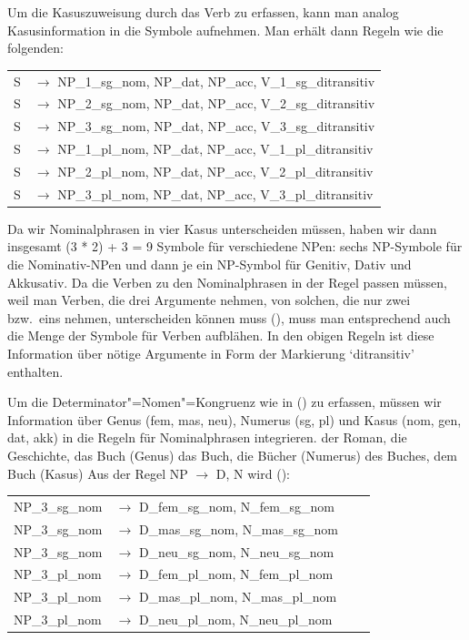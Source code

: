 Um die Kasuszuweisung durch das Verb zu erfassen, kann man analog Kasusinformation in die
Symbole aufnehmen. Man erhält dann Regeln wie die folgenden:
\ea
\label{ditrans-ps-regeln}
\begin{tabular}[t]{@{}l@{ }l}
S  & $\to$ NP\_1\_sg\_nom, NP\_dat, NP\_acc, V\_1\_sg\_ditransitiv\\
S  & $\to$ NP\_2\_sg\_nom, NP\_dat, NP\_acc, V\_2\_sg\_ditransitiv\\
S  & $\to$ NP\_3\_sg\_nom, NP\_dat, NP\_acc, V\_3\_sg\_ditransitiv\\
S  & $\to$ NP\_1\_pl\_nom, NP\_dat, NP\_acc, V\_1\_pl\_ditransitiv\\
S  & $\to$ NP\_2\_pl\_nom, NP\_dat, NP\_acc, V\_2\_pl\_ditransitiv\\
S  & $\to$ NP\_3\_pl\_nom, NP\_dat, NP\_acc, V\_3\_pl\_ditransitiv\\
\end{tabular}
\z
Da wir Nominalphrasen in vier Kasus unterscheiden müssen, haben wir dann
insgesamt (3 * 2) + 3 = 9 Symbole für verschiedene NPen: sechs NP-Symbole für die Nominativ-NPen und
dann je ein NP-Symbol für Genitiv, Dativ und Akkusativ. Da die Verben zu den Nominalphrasen
in der Regel passen müssen, weil man \zb Verben, die drei Argumente nehmen, von solchen,
die nur zwei bzw.\ eins nehmen, unterscheiden können muss (), muss man entsprechend auch
die Menge der Symbole für Verben aufblähen.
\eal
{}
\zl
In den obigen Regeln ist diese Information über nötige Argumente in Form der
Markierung `ditransitiv' enthalten.

Um die Determinator"=Nomen"=Kongruenz wie in () zu erfassen, müssen wir Information 
über Genus (fem, mas, neu), Numerus (sg, pl) und Kasus (nom, gen, dat, akk)
in die Regeln für Nominalphrasen integrieren.
\eal
\ex der Roman, die Geschichte, das Buch (Genus)
\ex das Buch, die Bücher (Numerus)
\ex des Buches, dem Buch (Kasus)
\zl
Aus der Regel NP $\to$ D, N wird ():
\ea
\begin{tabular}[t]{@{}l@{ }l@{\hspace{4mm}}l@{ }l}
NP\_3\_sg\_nom  & $\to$ D\_fem\_sg\_nom, N\_fem\_sg\_nom \\
NP\_3\_sg\_nom  & $\to$ D\_mas\_sg\_nom, N\_mas\_sg\_nom \\
NP\_3\_sg\_nom  & $\to$ D\_neu\_sg\_nom, N\_neu\_sg\_nom \\
NP\_3\_pl\_nom  & $\to$ D\_fem\_pl\_nom, N\_fem\_pl\_nom \\
NP\_3\_pl\_nom  & $\to$ D\_mas\_pl\_nom, N\_mas\_pl\_nom \\
NP\_3\_pl\_nom  & $\to$ D\_neu\_pl\_nom, N\_neu\_pl\_nom \\[2mm]
\end{tabular}

